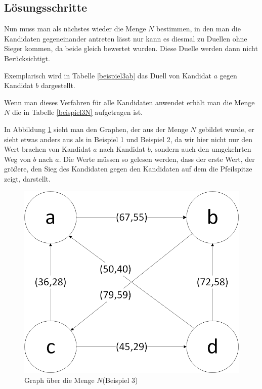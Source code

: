 \subsection{Lösungsschritte} 
\label{sec:loesungen3}
Nun muss man als nächstes wieder die Menge $N$ bestimmen, in den man die Kandidaten gegeneinander antreten lässt nur kann es diesmal zu Duellen ohne Sieger kommen, da beide gleich bewertet wurden. Diese Duelle werden dann nicht Berücksichtigt. 

Exemplarisch wird in Tabelle \ref{beispiel3ab} das Duell von Kandidat $a$ gegen Kandidat $b$ dargestellt. 




Wenn man dieses Verfahren für alle Kandidaten anwendet erhält man die Menge $N$ die in Tabelle \ref{beispiel3N} aufgetragen ist.



In Abbildung \ref{fig:graph3} sieht man den Graphen, der aus der Menge $N$ gebildet wurde, er sieht etwas anders aus als in Beispiel 1 und Beispiel 2, da wir hier nicht nur den Wert brachen von Kandidat $a$ nach Kandidat $b$, sondern auch den umgekehrten Weg von $b$ nach $a$. Die Werte müssen so gelesen werden, dass der erste Wert, der größere, den Sieg des Kandidaten gegen den Kandidaten auf dem die Pfeilspitze zeigt, darstellt.

\begin{figure}[!h]
\centering
\includegraphics[scale=0.5]{Bilder/Beispiel3_Graph.png}
\caption{Graph über die Menge $N$(Beispiel 3)}
\label{fig:graph3}
\end{figure}

